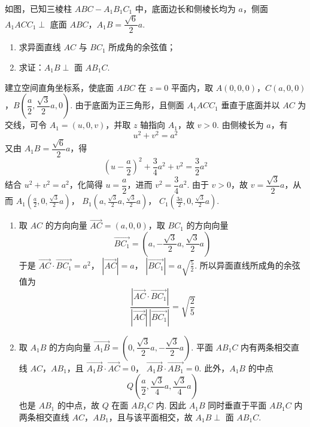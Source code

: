 \begin{problem}
如图，已知三棱柱 \(ABC-A_1B_1C_1\) 中，底面边长和侧棱长均为 \(a\)，侧面 \(A_1ACC_1\perp\) 底面 \(ABC\)，\(A_1B=\dfrac{\sqrt6}{2}a\).

\begin{enumerate}
\item 求异面直线 \(AC\) 与 \(BC_1\) 所成角的余弦值；
\item 求证：\(A_1B\perp\) 面 \(AB_1C\).
\end{enumerate}

\end{problem}

\begin{solution}
建立空间直角坐标系，使底面 \(ABC\) 在 \(z=0\) 平面内，取 \(A(0,0,0)\)，\(C(a,0,0)\)，\(B\left(\dfrac a2,\dfrac{\sqrt3}{2}a,0\right)\). 由于底面为正三角形，且侧面 \(A_1ACC_1\) 垂直于底面并以 \(AC\) 为交线，可令 \(A_1=(u,0,v)\)，并取 \(z\) 轴指向 \(A_1\)，故 \(v>0\). 由侧棱长为 \(a\)，有
\[
u^2+v^2=a^2
\]
又由 \(A_1B=\dfrac{\sqrt6}{2}a\)，得
\[
\left(u-\frac a2\right)^2+\frac34a^2+v^2=\frac32a^2
\]
结合 \(u^2+v^2=a^2\)，化简得 \(u=\dfrac a2\)，进而 \(v^2=\dfrac34a^2\). 由于 \(v>0\)，故 \(v=\dfrac{\sqrt3}{2}a\)，从而
\(A_1\left(\frac a2,0,\frac{\sqrt3}{2}a\right)\)，
\(B_1\left(a,\frac{\sqrt3}{2}a,\frac{\sqrt3}{2}a\right)\)，
\(C_1\left(\frac{3a}{2},0,\frac{\sqrt3}{2}a\right)\).
\begin{enumerate}
\item 取 \(AC\) 的方向向量 \(\overrightarrow{AC}=(a,0,0)\)，取 \(BC_1\) 的方向向量
\[
\overrightarrow{BC_1}=\left(a,-\frac{\sqrt3}{2}a,\frac{\sqrt3}{2}a\right)
\]
于是 \(\overrightarrow{AC}\cdot\overrightarrow{BC_1}=a^2\)，
\(|\overrightarrow{AC}|=a\)，
\(|\overrightarrow{BC_1}|=a\sqrt{\frac52}\).
所以异面直线所成角的余弦值为
\[
\frac{|\overrightarrow{AC}\cdot\overrightarrow{BC_1}|}{|\overrightarrow{AC}|\,|\overrightarrow{BC_1}|}=\sqrt{\frac25}
\]

\item 取 \(A_1B\) 的方向向量 \(\overrightarrow{A_1B}=\left(0,\dfrac{\sqrt3}{2}a,-\dfrac{\sqrt3}{2}a\right)\). 平面 \(AB_1C\) 内有两条相交直线 \(AC\)，\(AB_1\)，且
\(\overrightarrow{A_1B}\cdot\overrightarrow{AC}=0\)，
\(\overrightarrow{A_1B}\cdot\overrightarrow{AB_1}=0\).
此外，\(A_1B\) 的中点
\[
Q\left(\frac a2,\frac{\sqrt3}{4}a,\frac{\sqrt3}{4}a\right)
\]
也是 \(AB_1\) 的中点，故 \(Q\) 在面 \(AB_1C\) 内. 因此 \(A_1B\) 同时垂直于平面 \(AB_1C\) 内两条相交直线 \(AC\)，\(AB_1\)，且与该平面相交，故 \(A_1B\perp\) 面 \(AB_1C\).
\end{enumerate}
\end{solution}

